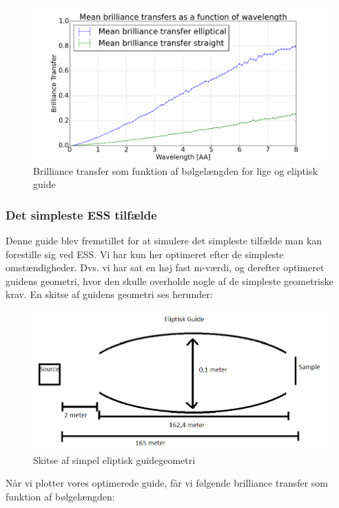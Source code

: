 \documentclass[12pt,oneside,a4paper]{article}
\begin{document}
{{{{{\begin{figure}[H]
\centering
\includegraphics[width=1\textwidth]{st_vs_elip_148950055477097.png}
\caption{Brilliance transfer som funktion af bølgelængden for lige og eliptisk guide}
\end{figure}


\subsubsection{Det simpleste ESS tilfælde}
Denne guide blev fremstillet for at simulere det simpleste tilfælde man kan forestille sig ved ESS. Vi har kun her optimeret efter de simpleste omstændigheder. Dvs. vi har sat en høj fast m-værdi, og derefter optimeret guidens geometri, hvor den skulle overholde nogle af de simpleste geometriske krav.
En skitse af guidens geometri ses herunder:

\begin{figure}[H]
\centering
\includegraphics[width=1\textwidth]{Elipse.png}
\caption{Skitse af simpel eliptisk guidegeometri}
\end{figure}

Når vi plotter vores optimerede guide, får vi følgende brilliance transfer som funktion af bølgelængden:

}}}}}
\end{document}
